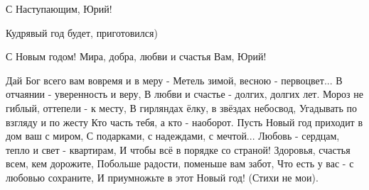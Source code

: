 \begin{itemize}
С Наступающим, Юрий!

Кудрявый год будет, приготовился)

С Новым годом! Мира, добра, любви и счастья Вам, Юрий!


\obeycr
Дай Бог всего вам вовремя и в меру -
Метель зимой, весною - первоцвет...
В отчаянии - уверенность и веру,
В любви и счастье - долгих, долгих лет.
Мороз не гиблый, оттепели - к месту,
В гирляндах ёлку, в звёздах небосвод,
Угадывать по взгляду и по жесту
Кто часть тебя, а кто - наоборот.
Пусть Новый год приходит в дом ваш с миром,
С подарками, с надеждами, с мечтой...
Любовь - сердцам, тепло и свет - квартирам,
И чтобы всё в порядке со страной!
Здоровья, счастья всем, кем дорожите,
Побольше радости, поменьше вам забот,
Что есть у вас - с любовью сохраните,
И приумножьте в этот Новый год!
\restorecr
(Стихи не мои).


\end{itemize} %

